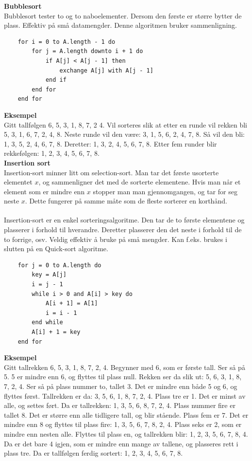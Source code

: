 \noindent \textbf{Bubblesort}\\
Bubblesort tester to og to naboelementer. Dersom den første er større bytter de plass. Effektiv på små datamengder. Denne algoritmen bruker sammenligning.

\begin{lstlisting}
    for i = 0 to A.length - 1 do
    	for j = A.length downto i + 1 do
		    if A[j] < A[j - 1] then
		    	exchange A[j] with A[j - 1]
		    end if
	    end for
    end for
\end{lstlisting}

\noindent \textbf{Eksempel}\\
Gitt tallfølgen 6, 5, 3, 1, 8, 7, 2 4. Vil sorteres slik at etter en runde vil rekken bli 5, 3, 1, 6, 7, 2, 4, 8. Neste runde vil den være: 3, 1, 5, 6, 2, 4, 7, 8. Så vil den bli: 1, 3, 5, 2, 4, 6, 7, 8. Deretter: 1, 3, 2, 4, 5, 6, 7, 8. Etter fem runder blir rekkefølgen: 1, 2, 3, 4, 5, 6, 7, 8.\\

\noindent \textbf{Insertion sort}\\
Insertion-sort minner litt om selection-sort. Man tar det første usorterte elementet $x$, og sammenligner det med de sorterte elementene. Hvis man når et element som er mindre enn $x$ stopper man man gjennomgangen, og tar for seg neste $x$. Dette fungerer på samme måte som de fleste sorterer en korthånd.
\\\\
Insertion-sort er en enkel sorteringsalgoritme. Den tar de to første elementene og plasserer i forhold til hverandre. Deretter plasserer den det neste i forhold til de to forrige, osv. Veldig effektiv å bruke på små mengder. Kan f.eks. brukes i slutten på en Quick-sort algoritme.

\begin{lstlisting}
    for j = 0 to A.length do
	    key = A[j]
	    i = j - 1
	    while i > 0 and A[i] > key do
	    	A[i + 1] = A[1]
	    	i = i - 1
	    end while
	    A[i] + 1 = key
    end for
\end{lstlisting}

\noindent \textbf{Eksempel}\\
Gitt tallrekken 6, 5, 3, 1, 8, 7, 2, 4. Begynner med 6, som er første tall. Ser så på 5. 5 er mindre enn 6, og flyttes til plass null. Rekken ser da slik ut: 5, 6, 3, 1, 8, 7, 2, 4. Ser så på plass nummer to, tallet 3. Det er mindre enn både 5 og 6, og flyttes først. Tallrekken er da: 3, 5, 6, 1, 8, 7, 2, 4. Plass tre er 1. Det er minst av alle, og settes ført. Da er tallrekken: 1, 3, 5, 6, 8, 7, 2, 4. Plass nummer fire er tallet 8. Det er større enn alle tidligere tall, og blir stående. Plass fem er 7. Det er mindre enn 8 og flyttes til plass fire: 1, 3, 5, 6, 7, 8, 2, 4. Plass seks er 2, som er mindre enn nesten alle. Flyttes til plass en, og tallrekken blir: 1, 2, 3, 5, 6, 7, 8, 4. Da er det bare 4 igjen, som er mindre enn mange av tallene, og plasseres rett i plass tre. Da er tallfølgen ferdig sortert: 1, 2, 3, 4, 5, 6, 7, 8.\\

